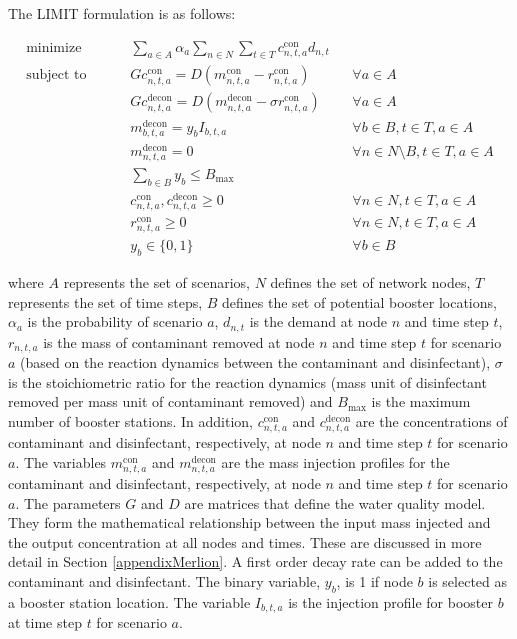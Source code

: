 The LIMIT formulation is as follows:

\begin{align}
\textrm{minimize }\qquad &\sum_{a\in A} \alpha_a\sum_{n\in N} \sum_{t\in T}  c^{\mathrm{con}}_{n,t,a} d_{n,t} \label{eq:mip_limit_1} \\
\textrm{subject to } \qquad &Gc^{\mathrm{\mathrm{con}}}_{n,t,a} = D(m^{\mathrm{\mathrm{con}}}_{n,t,a} - r^{\mathrm{\mathrm{con}}}_{n,t,a}) &&\forall{a\in A} \label{eq:mip_limit_2} \\
&Gc^{\mathrm{decon}}_{n,t,a} = D(m^{\mathrm{decon}}_{n,t,a} - \sigma r^{\mathrm{con}}_{n,t,a}) &&\forall{a\in A} \label{eq:mip_limit_3} \\
&m^{\mathrm{decon}}_{b,t,a} = y_{b}I_{b,t,a} &&\forall{b\in B,t\in T,a\in A} \label{eq:mip_limit_4} \\
&m^{\mathrm{decon}}_{n,t,a} = 0 &&\forall{n\in N \setminus B,t\in T,a\in A}\label{eq:mip_limit_5} \\
&\sum_{b\in B}y_{b} \leq B_{\max} \label{eq:mip_limit_6} \\
&c^{\mathrm{con}}_{n,t,a}, c^{\mathrm{decon}}_{n,t,a} \geq0 &&\forall{n\in N,t\in T,a\in A} \label{eq:mip_limit_7} \\
&r^{\mathrm{con}}_{n,t,a} \geq0 &&\forall{n\in N,t\in T,a\in A} \label{eq:mip_limit_8} \\
&y_{b} \in \{0,1\} &&\forall b\in B \label{eq:mip_limit_9} 
\end{align}

where $A$ represents the set of scenarios, $N$ defines the set of network nodes, 
$T$ represents the set of time steps, $B$ defines the set of potential booster locations,  
$\alpha_a$ is the probability of scenario $a$, $d_{n,t}$ is the demand at node $n$ and time step $t$, 
$r_{n,t,a}$ is the mass of contaminant removed at node $n$ and time step $t$ 
for scenario $a$ (based on the reaction dynamics between the contaminant and disinfectant), 
$\sigma$ is the stoichiometric ratio for the reaction dynamics (mass unit 
of disinfectant removed per mass unit of contaminant removed) 
and $B_{\max}$ is the maximum number of booster stations. 
In addition, $c^{\mathrm{con}}_{n,t,a}$ and $c^{\mathrm{decon}}_{n,t,a}$ are the concentrations of contaminant and 
disinfectant, respectively, at node $n$ and time step $t$ for scenario $a$. The variables 
$m^{\mathrm{con}}_{n,t,a}$ and $m^{\mathrm{decon}}_{n,t,a}$ are the mass injection profiles for the contaminant 
and disinfectant, respectively, at node $n$ and time step $t$ for scenario $a$. The parameters  
$G$ and $D$ are matrices that define the water quality model. They form the mathematical relationship 
between the input mass injected and the output concentration at all nodes and times. 
These are discussed in more detail in Section \ref{appendixMerlion}. A first 
order decay rate can be added to the contaminant and disinfectant. The binary variable, 
$y_{b}$, is 1 if node $b$ is selected as a booster station location. The variable 
$I_{b,t,a}$ is the injection profile for booster $b$ at time step $t$ for 
scenario $a$.


